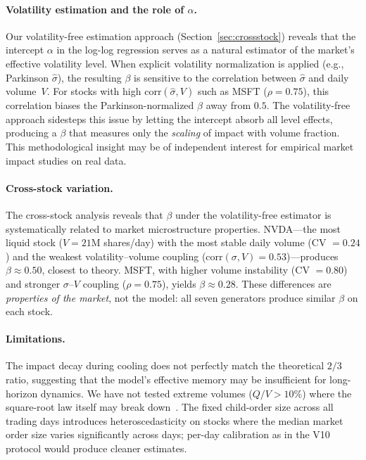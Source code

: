 \documentclass[sigplan,screen,anonymous]{acmart}
\begin{document}
\paragraph{Volatility estimation and the role of $\alpha$.} Our volatility-free estimation approach (Section~\ref{sec:crossstock}) reveals that the intercept $\alpha$ in the log-log regression serves as a natural estimator of the market's effective volatility level. When explicit volatility normalization is applied (e.g., Parkinson $\hat{\sigma}$), the resulting $\beta$ is sensitive to the correlation between $\hat{\sigma}$ and daily volume~$V$. For stocks with high corr$(\hat{\sigma}, V)$ such as MSFT ($\rho = 0.75$), this correlation biases the Parkinson-normalized $\beta$ away from $0.5$. The volatility-free approach sidesteps this issue by letting the intercept absorb all level effects, producing a $\beta$ that measures only the \emph{scaling} of impact with volume fraction. This methodological insight may be of independent interest for empirical market impact studies on real data.

\paragraph{Cross-stock variation.} The cross-stock analysis reveals that $\beta$ under the volatility-free estimator is systematically related to market microstructure properties. NVDA---the most liquid stock ($V = 21$M shares/day) with the most stable daily volume (CV $= 0.24$) and the weakest volatility--volume coupling (corr$(\sigma,V) = 0.53$)---produces $\beta \approx 0.50$, closest to theory. MSFT, with higher volume instability (CV $= 0.80$) and stronger $\sigma$--$V$ coupling ($\rho = 0.75$), yields $\beta \approx 0.28$. These differences are \emph{properties of the market}, not the model: all seven generators produce similar $\beta$ on each stock.

\paragraph{Limitations.} The impact decay during cooling does not perfectly match the theoretical $2/3$ ratio, suggesting that the model's effective memory may be insufficient for long-horizon dynamics. We have not tested extreme volumes ($Q/V > 10\%$) where the square-root law itself may break down~\cite{gabaix2003theory}. The fixed child-order size across all trading days introduces heteroscedasticity on stocks where the median market order size varies significantly across days; per-day calibration as in the V10 protocol would produce cleaner estimates.
\end{document}
